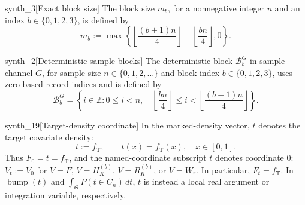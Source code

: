 \begin{definitionv}{synth_3}[Exact block size]
The block size \(m_b\), for a nonnegative integer \(n\) and an index \(b\in\{0,1,2,3\}\), is defined by
\[
m_b := \max\left\{
\left\lfloor \frac{(b+1)n}{4} \right\rfloor
-
\left\lfloor \frac{bn}{4} \right\rfloor,
0
\right\}.
\]
\end{definitionv}

\begin{definitionv}{synth_2}[Deterministic sample blocks]
The deterministic block \(\mathcal B_b^G\) in sample channel \(G\), for sample size \(n\in\{0,1,2,\ldots\}\) and block index \(b\in\{0,1,2,3\}\), uses zero-based record indices and is defined by
\[
\mathcal B_b^G
=
\left\{
i\in\mathbb Z:
0\le i<n,\quad
\left\lfloor\frac{bn}{4}\right\rfloor
\le i<
\left\lfloor\frac{(b+1)n}{4}\right\rfloor
\right\}.
\]
\end{definitionv}

\begin{definitionv}{synth_19}[Target-density coordinate]
In the marked-density vector, \(t\) denotes the target covariate density:
\[
t:=f_{\mathrm T},\qquad t(x)=f_{\mathrm T}(x),\quad x\in[0,1].
\]
Thus \(F_0=t=f_{\mathrm T}\), and the named-coordinate subscript \(t\) denotes coordinate \(0\): \(V_t:=V_0\) for \(V=F\), \(V=H_K^{(b)}\), \(V=R_K^{(b)}\), or \(V=W_r\). In particular, \(F_t=f_{\mathrm T}\). In \(\operatorname{bump}(t)\) and \(\int_{\Theta}P(t\in C_n)\,dt\), \(t\) is instead a local real argument or integration variable, respectively.
\end{definitionv}


